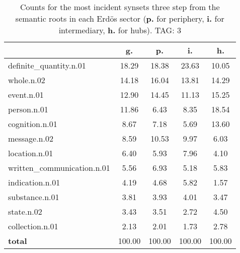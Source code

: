 \begin{table}[h!]
\begin{center}
\begin{tabular}{| l | c | c | c | c |}\hline
 & g. & p. & i. & h. \\\hline
definite\_quantity.n.01 & 18.29  & 18.38  & 23.63  & 10.05 \\\hline
whole.n.02 & 14.18  & 16.04  & 13.81  & 14.29 \\\hline
event.n.01 & 12.90  & 14.45  & 11.13  & 15.25 \\\hline
person.n.01 & 11.86  & 6.43  & 8.35  & 18.54 \\\hline
cognition.n.01 & 8.67  & 7.18  & 5.69  & 13.60 \\\hline
message.n.02 & 8.59  & 10.53  & 9.97  & 6.03 \\\hline
location.n.01 & 6.40  & 5.93  & 7.96  & 4.10 \\\hline
written\_communication.n.01 & 5.56  & 6.93  & 5.18  & 5.83 \\\hline
indication.n.01 & 4.19  & 4.68  & 5.82  & 1.57 \\\hline
substance.n.01 & 3.81  & 3.93  & 4.01  & 3.47 \\\hline
state.n.02 & 3.43  & 3.51  & 2.72  & 4.50 \\\hline
collection.n.01 & 2.13  & 2.01  & 1.73  & 2.78 \\\hline
{{\bf total}} & 100.00  & 100.00  & 100.00  & 100.00 \\\hline
\end{tabular}
\caption{Counts for the most incident synsets three step from the semantic roots in each Erd\"os sector ({\bf p.} for periphery, {\bf i.} for intermediary, {\bf h.} for hubs). TAG: 3}
\end{center}
\end{table}